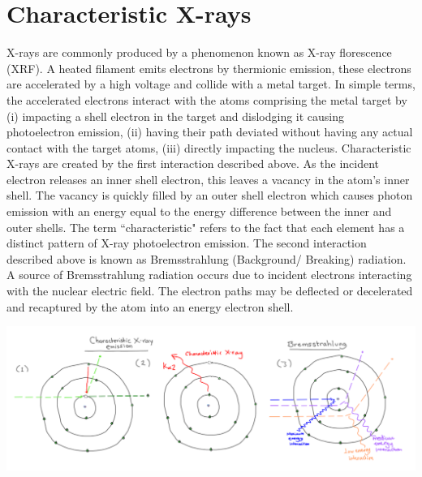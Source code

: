\documentclass[10pt, a4paper, singlespacing]{report}
\newenvironment{Figure}
    {\par\medskip\noindent\minipage{\linewidth}}
    {\endminipage\par\medskip}
\begin{document}
\section{Characteristic X-rays}\label{char Xrays}
X-rays are commonly produced by a phenomenon known as X-ray florescence (XRF). A heated filament emits electrons by thermionic emission, these electrons are accelerated by a high voltage and collide with a metal target. In simple terms, the accelerated electrons interact with the atoms comprising the metal target by (i) impacting a shell electron in the target and dislodging it causing photoelectron emission, (ii) having their path deviated without having any actual contact with the target atoms, (iii) directly impacting the nucleus.
Characteristic X-rays are created by the first interaction described above. As the incident electron releases an inner shell electron, this leaves a vacancy in the atom's inner shell. The vacancy is quickly filled by an outer shell electron which causes photon emission with an energy equal to the energy difference between the inner and outer shells. The term ``characteristic" refers to the fact that each element has a distinct pattern of X-ray photoelectron emission.
The second interaction described above is known as Bremsstrahlung (Background/ Breaking) radiation. A source of Bremsstrahlung radiation occurs due to incident electrons interacting with the nuclear electric field. The electron paths may be deflected or decelerated and recaptured by the atom into an energy electron shell. 
\begin{Figure}
\centering
\includegraphics[width=\linewidth]{characteristic_Bremsstrahlung.pdf}\label{fig:3}
\end{Figure}
\end{document}
